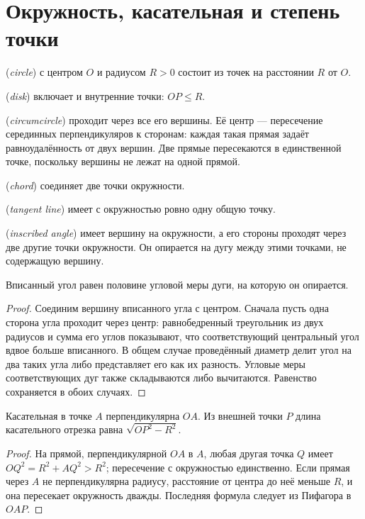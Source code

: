 \section{Окружность, касательная и степень точки}
\begin{definition} (\emph{circle}) с центром \(O\) и радиусом \(R>0\) состоит из точек на расстоянии \(R\) от \(O\). \par{} (\emph{disk}) включает и внутренние точки: \(OP\le R\).\end{definition}
\begin{definition} (\emph{circumcircle}) проходит через все его вершины. Её центр — пересечение серединных перпендикуляров к сторонам: каждая такая прямая задаёт равноудалённость от двух вершин. Две прямые пересекаются в единственной точке, поскольку вершины не лежат на одной прямой.\end{definition}
\begin{definition} (\emph{chord}) соединяет две точки окружности. \par{} (\emph{tangent line}) имеет с окружностью ровно одну общую точку.\end{definition}
\begin{definition} (\emph{inscribed angle}) имеет вершину на окружности, а его стороны проходят через две другие точки окружности. Он опирается на дугу между этими точками, не содержащую вершину.\end{definition}
\begin{theorem}
Вписанный угол равен половине угловой меры дуги, на которую он опирается.
\end{theorem}
\begin{proof}Соединим вершину вписанного угла с центром. Сначала пусть одна сторона угла проходит через центр: равнобедренный треугольник из двух радиусов и сумма его углов показывают, что соответствующий центральный угол вдвое больше вписанного. В общем случае проведённый диаметр делит угол на два таких угла либо представляет его как их разность. Угловые меры соответствующих дуг также складываются либо вычитаются. Равенство сохраняется в обоих случаях.\end{proof}
\begin{theorem}
Касательная в точке \(A\) перпендикулярна \(OA\). Из внешней точки \(P\) длина касательного отрезка равна \(\sqrt{OP^2-R^2}\).
\end{theorem}
\begin{proof}На прямой, перпендикулярной \(OA\) в \(A\), любая другая точка \(Q\) имеет \(OQ^2=R^2+AQ^2>R^2\); пересечение с окружностью единственно. Если прямая через \(A\) не перпендикулярна радиусу, расстояние от центра до неё меньше \(R\), и она пересекает окружность дважды. Последняя формула следует из Пифагора в \(OAP\).\end{proof}
